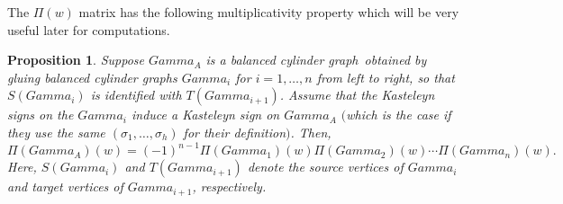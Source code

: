 \documentclass[10pt,a4paper]{amsart}
\numberwithin{equation}{section}
\newtheorem{Proposition}[Theorem]{Proposition}
 { \theoremstyle{definition}
\newtheorem{Definition}[Theorem]{Definition}
\newtheorem{Note}[Theorem]{Note}
\newtheorem{Example}[Theorem]{Example}
\newtheorem{Remark}[Theorem]{Remark} }
\newcommand{\bcg}{{balanced cylinder graph}}
\newcommand{\A}{{\mathbb A}}
\newcommand{\la}{\label}
\def\A{A}
\def\Gamma{Gamma}
\begin{document}
	The $\Pi(w)$ matrix has the following multiplicativity property which will be very useful later for computations.
	
	\begin{Proposition}\la{prop:prod}
		Suppose $\Gamma_\A$ is a \bcg\ obtained by gluing \bcg s $\Gamma_i$ for $i=1, \dots, n$ from left to right, so that $S(\Gamma_i)$ is identified with $T(\Gamma_{i+1})$. Assume that the Kasteleyn signs on the $\Gamma_i$ induce a Kasteleyn sign on $\Gamma_\A$ $($which is the case if they use the same $(\sigma_1,\dots,\sigma_h)$ for their definition$)$. Then,
		\[
		\Pi(\Gamma_\A)(w)=(-1)^{n-1}\Pi(\Gamma_1)(w) \Pi(\Gamma_{2})(w) \cdots \Pi(\Gamma_n)(w).
		\]
		Here, $S(\Gamma_i)$ and $T(\Gamma_{i+1})$ denote the source vertices of $\Gamma_i$ and target vertices of $\Gamma_{i+1}$, respectively.
	\end{Proposition}
	
\end{document}
